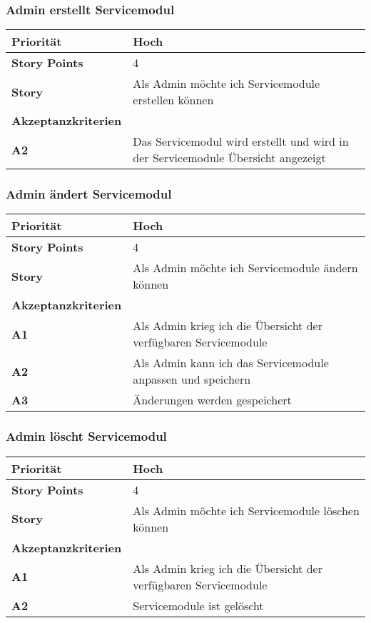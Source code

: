  \subsubsection{Admin erstellt Servicemodul}
\begin{tabularx}{\linewidth}{l X}
  \textbf{Priorität} & Hoch\\
  \hline
  \textbf{Story Points} & 4\\
  \hline
  \textbf{Story}& Als Admin möchte ich Servicemodule erstellen können\\
 \hline
    \textbf{Akzeptanzkriterien} & \\
    \hline
  \textbf{A2} & Das Servicemodul wird erstellt und wird in der Servicemodule Übersicht angezeigt\\
  \hline
\end{tabularx}
 
   \subsubsection{Admin ändert Servicemodul}
\begin{tabularx}{\linewidth}{l X}
  \textbf{Priorität} & Hoch\\
  \hline
  \textbf{Story Points} & 4\\
  \hline
  \textbf{Story}& Als Admin möchte ich Servicemodule ändern können\\
  \hline
   \textbf{Akzeptanzkriterien} & \\
    \hline
  \textbf{A1} & Als Admin krieg ich die Übersicht der verfügbaren Servicemodule\\
  \hline
  \textbf{A2} & Als Admin kann ich das Servicemodule anpassen und speichern\\
  \hline
   \textbf{A3} & Änderungen werden gespeichert\\
 \hline
 \end{tabularx}

 
 \subsubsection{Admin löscht Servicemodul}

 \begin{tabularx}{\linewidth}{l X}
 \textbf{Priorität} & Hoch\\
 \hline
  \textbf{Story Points} & 4\\
  \hline
  \textbf{Story}& Als Admin möchte ich Servicemodule löschen können\\
  \hline
   \textbf{Akzeptanzkriterien} & \\
   \hline
   \textbf{A1} & Als Admin krieg ich die Übersicht der verfügbaren Servicemodule\\
   \hline
   \textbf{A2} & Servicemodule ist gelöscht\\
     \hline
\end{tabularx}

